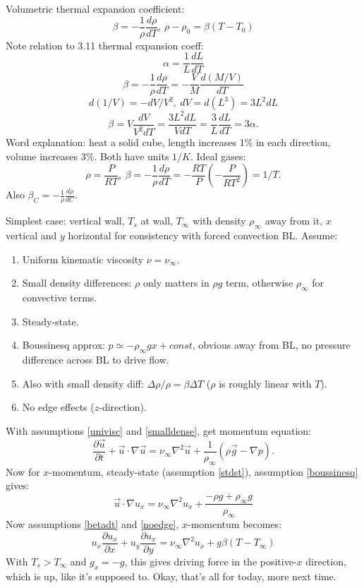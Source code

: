 \documentclass{report}
\begin{document}
Volumetric thermal expansion coefficient:
$$\beta = -\frac{1}{\rho}\frac{d\rho}{dT},\ \rho - \rho_0 = \beta(T-T_0)$$
Note relation to 3.11 thermal expansion coeff:
$$\alpha = \frac{1}{L}\frac{dL}{dT}$$
$$\beta = -\frac{1}{\rho}\frac{d\rho}{dT} = -\frac{V}{M}\frac{d(M/V)}{dT}$$
$$d(1/V) = -dV/V^2,\ dV=d(L^3)=3L^2dL$$
$$\beta = V\frac{dV}{V^2dT} = \frac{3L^2 dL}{VdT} = \frac{3}{L}\frac{dL}{dT} =
3\alpha.$$
Word explanation: heat a solid cube, length increases 1\% in each direction,
volume increases 3\%.  Both have units $1/K$.  Ideal gases:
$$\rho=\frac{P}{RT},\ \beta=-\frac{1}{\rho}\frac{d\rho}{dT} =
-\frac{RT}{P}\left(-\frac{P}{RT^2}\right) = 1/T.$$
Also $\beta_C = -\frac{1}{\rho}\frac{d\rho}{dC}$.

Simplest case: vertical wall, $T_s$ at wall, $T_\infty$ with density
$\rho_\infty$ away from it, $x$ vertical and $y$ horizontal for consistency
with forced convection BL.  Assume:
\begin{enumerate}
\item \label{univisc} Uniform kinematic viscosity $\nu=\nu_\infty$.
\item \label{smalldense} Small density differences: $\rho$ only matters in
  $\rho g$ term, otherwise $\rho_\infty$ for convective terms.
\item \label{stdst} Steady-state.
\item \label{boussinesq} Boussinesq approx: $p\simeq-\rho_\infty gx+const$,
  obvious away from BL, no pressure difference across BL to drive flow.
\item \label{betadt} Also with small density diff: $\Delta\rho/\rho =
  \beta\Delta T$ ($\rho$ is roughly linear with $T$).
\item \label{noedge} No edge effects ($z$-direction).
\end{enumerate}
With assumptions \ref{univisc} and \ref{smalldense}, get momentum equation:
$$\frac{\partial\vec{u}}{\partial t}+\vec{u}\cdot\nabla\vec{u} =
\nu_\infty\nabla^2\vec{u} +
\frac{1}{\rho_\infty}\left(\rho \vec{g}-\nabla p\right).$$
Now for $x$-momentum, steady-state (assumption \ref{stdst}), assumption
\ref{boussinesq} gives:
$$\vec{u}\cdot\nabla u_x = \nu_\infty\nabla^2 u_x +
\frac{-\rho g+\rho_\infty g}{\rho_\infty}$$
Now assumptions \ref{betadt} and \ref{noedge}, $x$-momentum becomes:
$$u_x\frac{\partial u_x}{\partial x} + u_y\frac{\partial u_x}{\partial y} =
\nu_\infty\nabla^2 u_x + g\beta(T-T_\infty)$$
With $T_s>T_\infty$ and $g_x=-g$, this gives driving force in the positive-$x$
direction, which is up, like it's supposed to.  Okay, that's all for today,
more next time.
\newpage
\end{document}
